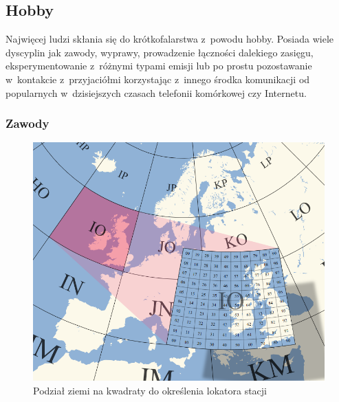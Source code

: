 \documentclass[]{mgr}
\begin{document}
            \subsection{Hobby}
            Najwięcej ludzi skłania się do krótkofalarstwa z~powodu hobby. Posiada wiele dyscyplin jak zawody, wyprawy, prowadzenie łączności dalekiego zasięgu, eksperymentowanie z~różnymi typami emisji lub po prostu pozostawanie w~kontakcie z~przyjaciółmi korzystając z~innego środka komunikacji od popularnych w~dzisiejszych czasach telefonii komórkowej czy Internetu.

                \subsubsection{Zawody}
                    \begin{figure}
                        \vspace{-25pt}
                        \begin{center}
                            \includegraphics[scale=0.20]{gridsquare}
                        \end{center}
                        \vspace{-20pt}
                        \caption{Podział ziemi na kwadraty do określenia lokatora stacji}
                        \vspace{-10pt}
                        \label{fig:gridsquare}
                    \end{figure}
\end{document}
